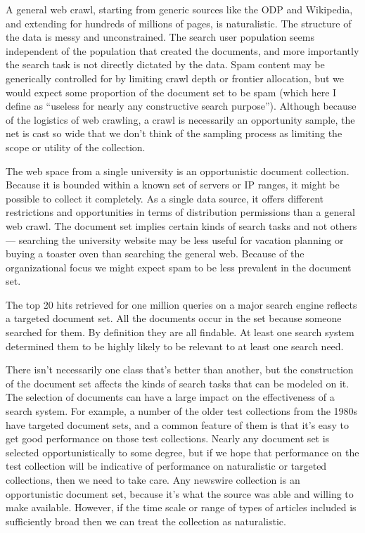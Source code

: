 \documentclass[nobib]{tufte-book}
\begin{document}
A general web crawl, starting from generic sources like the ODP and Wikipedia, and extending for hundreds of millions of pages, is naturalistic.  The structure of the data is messy and unconstrained.  The search user population seems independent of the population that created the documents, and more importantly the search task is not directly dictated by the data.  Spam content may be generically controlled for by limiting crawl depth or frontier allocation, but we would expect some proportion of the document set to be spam (which here I define as ``useless for nearly any constructive search purpose'').  Although because of the logistics of web crawling, a crawl is necessarily an opportunity sample, the net is cast so wide that we don't think of the sampling process as limiting the scope or utility of the collection.

The web space from a single university is an opportunistic document collection.  Because it is bounded within a known set of servers or IP ranges, it might be possible to collect it completely.  As a single data source, it offers different restrictions and opportunities in terms of distribution permissions than a general web crawl.  The document set implies certain kinds of search tasks and not others --- searching the university website may be less useful for vacation planning or buying a toaster oven than searching the general web.  Because of the organizational focus we might expect spam to be less prevalent in the document set.

The top 20 hits retrieved for one million queries on a major search engine reflects a targeted document set.  All the documents occur in the set because someone searched for them.  By definition they are all findable.  At least one search system determined them to be highly likely to be relevant to at least one search need.

There isn't necessarily one class that's better than another, but the construction of the document set affects the kinds of search tasks that can be modeled on it.  The selection of documents can have a large impact on the effectiveness of a search system.  For example, a number of the older test collections from the 1980s have targeted document sets, and a common feature of them is that it's easy to get good performance on those test collections.  Nearly any document set is selected opportunistically to some degree, but if we hope that performance on the test collection will be indicative of performance on naturalistic or targeted collections, then we need to take care.  Any newswire collection is an opportunistic document set, because it's what the source was able and willing to make available.  However, if the time scale or range of types of articles included is sufficiently broad then we can treat the collection as naturalistic.
\end{document}
